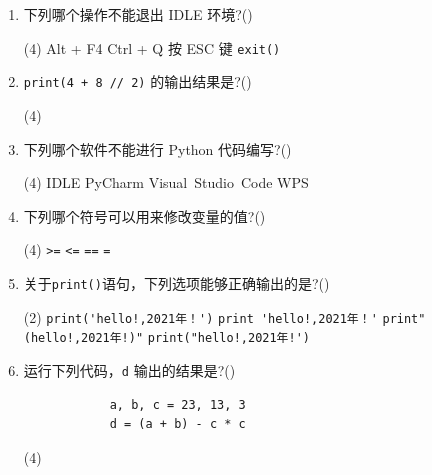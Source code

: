 \documentclass[11pt]{ctexart}
\begin{document}
    \begin{enumerate}
        \item 下列哪个操作不能退出 IDLE 环境?(\qquad)
        \begin{tasks}(4)
            \task Alt + F4
            \task Ctrl + Q
            \task 按 ESC 键
            \task \lstinline{exit()}
        \end{tasks}
    

        \item \lstinline!print(4 + 8 // 2)! 的输出结果是?(\qquad)
        \begin{tasks}(4)
        \end{tasks}

        \item 下列哪个软件不能进行 Python 代码编写?(\qquad)
        \begin{tasks}(4)
            \task IDLE
            \task PyCharm
            \task Visual~Studio~Code
            \task WPS
        \end{tasks}
    
        \item 下列哪个符号可以用来修改变量的值?(\qquad)
        \begin{tasks}(4)
            \task \lstinline{>=}
            \task \lstinline{<=}
            \task \lstinline{==}
            \task \lstinline{=}
        \end{tasks}

        \item 关于\lstinline!print()!语句，下列选项能够正确输出的是?(\qquad)
        \begin{tasks}(2)
            \task \lstinline{print('hello!,2021年！')}
            \task \lstinline{print 'hello!,2021年！'}
            \task \lstinline{print"(hello!,2021年!)"}
            \task \lstinline{print("hello!,2021年!')}
        \end{tasks}

        \item 运行下列代码，\lstinline{d} 输出的结果是?(\qquad)
        \begin{lstlisting}
            a, b, c = 23, 13, 3
            d = (a + b) - c * c
        \end{lstlisting}
        \begin{tasks}(4)
        \end{tasks}


\end{enumerate}
\end{document}
